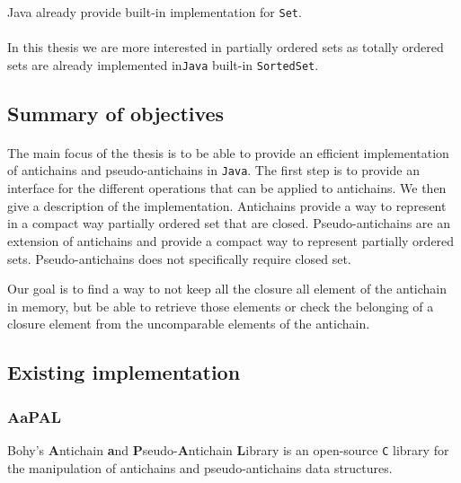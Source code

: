 \documentclass[letterpaper]{article}
\begin{document}
Java already provide built-in implementation for \texttt{Set}.

\paragraph{}

In this thesis we are more interested in partially ordered sets as
totally ordered sets are already implemented
in\texttt{Java} built-in
\texttt{SortedSet}.

\subsection{Summary of objectives}


\paragraph{}


The main focus of the thesis is to be able to provide an efficient
implementation of antichains and pseudo-antichains in \texttt{Java}.
The first step is to provide an interface for the different operations that
can be applied to antichains. We then give a description of the implementation.
Antichains provide a way to represent
in a compact way partially ordered set that are closed. Pseudo-antichains
are an extension of antichains and provide a compact way to represent
partially ordered sets. Pseudo-antichains does not specifically require
closed set.

Our goal is to find a way to not keep all the closure all
element of the antichain in memory, but be able to retrieve those elements
or check the belonging of a closure element from the uncomparable elements
of the antichain.

\subsection{Existing implementation}

\subsubsection{AaPAL}

Bohy's \textbf{A}ntichain
\textbf{a}nd \textbf{P}seudo-\textbf{A}ntichain \textbf{L}ibrary \cite{aapal}
is an open-source \texttt{C} library for the manipulation
of antichains and pseudo-antichains data structures.
\end{document}
